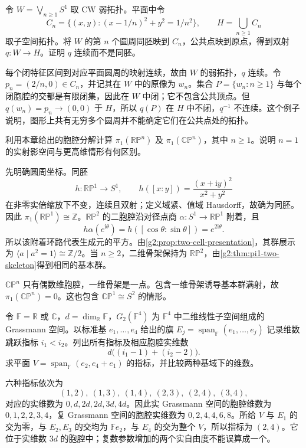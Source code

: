 \begin{exercise}\label{g2:ex:CW-wedge-topology}
	令 \(W=\bigvee_{n\ge1}S^1\) 取 CW 弱拓扑。平面中令
	\[
		C_n=\{(x,y):(x-1/n)^2+y^2=1/n^2\},
		\qquad H=\bigcup_{n\ge1}C_n
	\]
	取子空间拓扑。将 \(W\) 的第 \(n\) 个圆周同胚映到 \(C_n\)，公共点映到原点，得到双射 \(q:W\to H\)。证明 \(q\) 连续而不是同胚。
\end{exercise}
\begin{solution}
	每个闭特征区间到对应平面圆周的映射连续，故由 \(W\) 的弱拓扑，\(q\) 连续。令 \(p_n=(2/n,0)\in C_n\)，并记其在 \(W\) 中的原像为 \(w_n\)。集合 \(P=\{w_n:n\ge1\}\) 与每个闭胞腔的交都是有限闭集，因此在 \(W\) 中闭；它不包含公共顶点。但 \(q(w_n)=p_n\to(0,0)\) 于 \(H\)，所以 \(q(P)\) 在 \(H\) 中不闭，\(q^{-1}\) 不连续。这个例子说明，图形上共有无穷多个圆周并不能确定它们在公共点处的拓扑。
\end{solution}

\begin{exercise}\label{g2:ex:projective-pi1}
	利用本章给出的胞腔分解计算 \(\pi_1(\mathbb{RP}^n)\) 及 \(\pi_1(\mathbb{CP}^n)\)，其中 \(n\ge1\)。说明 \(n=1\) 的实射影空间与更高维情形有何区别。
\end{exercise}
\begin{solution}
	先明确圆周坐标。同胚
	\[
		h:\mathbb{RP}^1\longrightarrow S^1,\qquad
		h([x:y])=\frac{(x+\mathrm{i}y)^2}{x^2+y^2}
	\]
	在非零实倍缩放下不变，连续且双射；定义域紧、值域 Hausdorff，故确为同胚。因此 \(\pi_1(\mathbb{RP}^1)\cong\mathbb Z\)。\(\mathbb{RP}^2\) 的二胞腔沿对径点商 \(\alpha:S^1\to\mathbb{RP}^1\) 附着，且
	\[
		h\alpha(e^{\mathrm{i}\theta})
		=h([\cos\theta:\sin\theta])=e^{2\mathrm{i}\theta}.
	\]
	所以该附着环路代表生成元的平方。由\cref{g2:prop:two-cell-presentation}，其群展示为 \(\langle a\mid a^2=1\rangle\cong\mathbb Z/2\)。当 \(n\ge2\)，二维骨架保持为 \(\mathbb{RP}^2\)，由\cref{g2:thm:pi1-two-skeleton}得到相同的基本群。

	\(\mathbb{CP}^n\) 只有偶数维胞腔，一维骨架是一点。包含一维骨架诱导基本群满射，故 \(\pi_1(\mathbb{CP}^n)=0\)。这也包含 \(\mathbb{CP}^1\cong S^2\) 的情形。
\end{solution}

\begin{exercise}\label{g2:ex:grassmann-small-cells}
	令 \(\mathbb F=\mathbb R\) 或 \(\mathbb C\)，\(d=\dim_{\mathbb R}\mathbb F\)，\(G_2(\mathbb F^4)\) 为 \(\mathbb F^4\) 中二维线性子空间组成的 Grassmann 空间。以标准基 \(e_1,\ldots,e_4\) 给出的旗 \(E_j=\operatorname{span}_{\mathbb F}(e_1,\ldots,e_j)\) 记录维数跳跃指标 \(i_1<i_2\)。列出所有指标及相应胞腔实维数
	\[
		d\bigl((i_1-1)+(i_2-2)\bigr).
	\]
	求平面 \(V=\operatorname{span}_{\mathbb F}(e_2,e_4+e_1)\) 的指标，并比较两种基域下的维数。
\end{exercise}
\begin{solution}
	六种指标依次为
	\[
		(1,2),\ (1,3),\ (1,4),\ (2,3),\ (2,4),\ (3,4),
	\]
	对应的实维数为 \(0,d,2d,2d,3d,4d\)。因此实 Grassmann 空间的胞腔维数为 \(0,1,2,2,3,4\)，复 Grassmann 空间的胞腔实维数为 \(0,2,4,4,6,8\)。所给 \(V\) 与 \(E_1\) 的交为零，与 \(E_2,E_3\) 的交均为 \(\mathbb F e_2\)，与 \(E_4\) 的交为整个 \(V\)，所以指标为 \((2,4)\)。它位于实维数 \(3d\) 的胞腔中；复数参数增加的两个实自由度不能误算成一个。
\end{solution}

